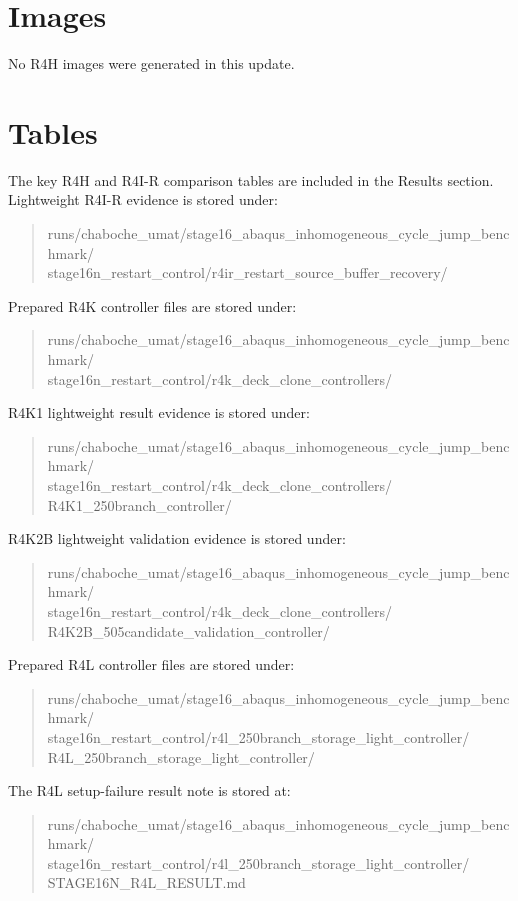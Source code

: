 \documentclass{article}
\begin{document}
\section{Images}
No R4H images were generated in this update.

\section{Tables}
The key R4H and R4I-R comparison tables are included in the Results section. Lightweight R4I-R evidence is stored under:
\begin{quote}\footnotesize\ttfamily
runs/chaboche\_umat/stage16\_abaqus\_inhomogeneous\_cycle\_jump\_benchmark/\\
stage16n\_restart\_control/r4ir\_restart\_source\_buffer\_recovery/
\end{quote}
Prepared R4K controller files are stored under:
\begin{quote}\footnotesize\ttfamily
runs/chaboche\_umat/stage16\_abaqus\_inhomogeneous\_cycle\_jump\_benchmark/\\
stage16n\_restart\_control/r4k\_deck\_clone\_controllers/
\end{quote}
R4K1 lightweight result evidence is stored under:
\begin{quote}\footnotesize\ttfamily
runs/chaboche\_umat/stage16\_abaqus\_inhomogeneous\_cycle\_jump\_benchmark/\\
stage16n\_restart\_control/r4k\_deck\_clone\_controllers/\\
R4K1\_250branch\_controller/
\end{quote}
R4K2B lightweight validation evidence is stored under:
\begin{quote}\footnotesize\ttfamily
runs/chaboche\_umat/stage16\_abaqus\_inhomogeneous\_cycle\_jump\_benchmark/\\
stage16n\_restart\_control/r4k\_deck\_clone\_controllers/\\
R4K2B\_505candidate\_validation\_controller/
\end{quote}
Prepared R4L controller files are stored under:
\begin{quote}\footnotesize\ttfamily
runs/chaboche\_umat/stage16\_abaqus\_inhomogeneous\_cycle\_jump\_benchmark/\\
stage16n\_restart\_control/r4l\_250branch\_storage\_light\_controller/\\
R4L\_250branch\_storage\_light\_controller/
\end{quote}
The R4L setup-failure result note is stored at:
\begin{quote}\footnotesize\ttfamily
runs/chaboche\_umat/stage16\_abaqus\_inhomogeneous\_cycle\_jump\_benchmark/\\
stage16n\_restart\_control/r4l\_250branch\_storage\_light\_controller/\\
STAGE16N\_R4L\_RESULT.md
\end{quote}
\end{document}

